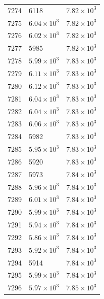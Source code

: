 \begin{table}[H]
\begin{tabular}{lll}
7274 & 6118 & $\displaystyle 7.82 \times 10^{3}$ \\
7275 & $\displaystyle 6.04 \times 10^{3}$ & $\displaystyle 7.82 \times 10^{3}$ \\
7276 & $\displaystyle 6.02 \times 10^{3}$ & $\displaystyle 7.82 \times 10^{3}$ \\
7277 & 5985 & $\displaystyle 7.82 \times 10^{3}$ \\
7278 & $\displaystyle 5.99 \times 10^{3}$ & $\displaystyle 7.83 \times 10^{3}$ \\
7279 & $\displaystyle 6.11 \times 10^{3}$ & $\displaystyle 7.83 \times 10^{3}$ \\
7280 & $\displaystyle 6.12 \times 10^{3}$ & $\displaystyle 7.83 \times 10^{3}$ \\
7281 & $\displaystyle 6.04 \times 10^{3}$ & $\displaystyle 7.83 \times 10^{3}$ \\
7282 & $\displaystyle 6.04 \times 10^{3}$ & $\displaystyle 7.83 \times 10^{3}$ \\
7283 & $\displaystyle 6.06 \times 10^{3}$ & $\displaystyle 7.83 \times 10^{3}$ \\
7284 & 5982 & $\displaystyle 7.83 \times 10^{3}$ \\
7285 & $\displaystyle 5.95 \times 10^{3}$ & $\displaystyle 7.83 \times 10^{3}$ \\
7286 & 5920 & $\displaystyle 7.83 \times 10^{3}$ \\
7287 & 5973 & $\displaystyle 7.84 \times 10^{3}$ \\
7288 & $\displaystyle 5.96 \times 10^{3}$ & $\displaystyle 7.84 \times 10^{3}$ \\
7289 & $\displaystyle 6.01 \times 10^{3}$ & $\displaystyle 7.84 \times 10^{3}$ \\
7290 & $\displaystyle 5.99 \times 10^{3}$ & $\displaystyle 7.84 \times 10^{3}$ \\
7291 & $\displaystyle 5.94 \times 10^{3}$ & $\displaystyle 7.84 \times 10^{3}$ \\
7292 & $\displaystyle 5.86 \times 10^{3}$ & $\displaystyle 7.84 \times 10^{3}$ \\
7293 & $\displaystyle 5.92 \times 10^{3}$ & $\displaystyle 7.84 \times 10^{3}$ \\
7294 & 5914 & $\displaystyle 7.84 \times 10^{3}$ \\
7295 & $\displaystyle 5.99 \times 10^{3}$ & $\displaystyle 7.84 \times 10^{3}$ \\
7296 & $\displaystyle 5.97 \times 10^{3}$ & $\displaystyle 7.85 \times 10^{3}$ \\

\end{tabular}
\end{table}
